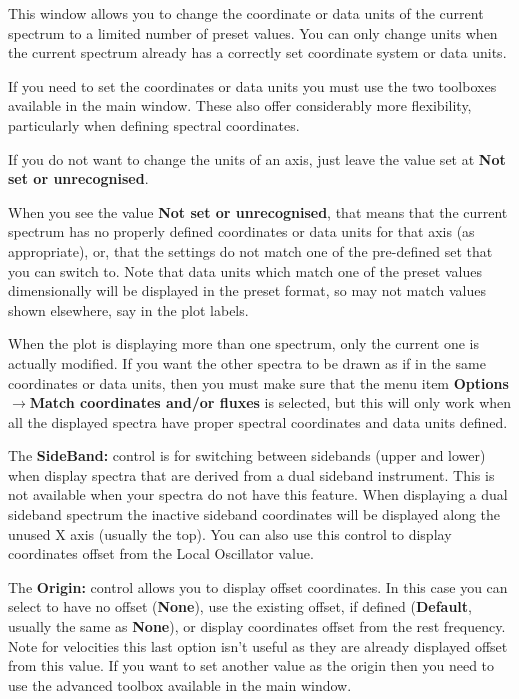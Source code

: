 \documentclass[twoside,11pt]{article}
\newcommand{\latexhtml}[2]{#1}
\renewcommand{\_}{\texttt{\symbol{95}}}
\newcommand{\submenuitem}[2]{\latexhtml{\textbf{#1$\rightarrow$#2}}{\textbf{#1->#2}}}
\newcommand{\labelitem}[1]{\textbf{#1}}
\begin{document}
This window allows you to change the coordinate or data units of the current
spectrum to a limited number of preset values. You can only change units when
the current spectrum already has a correctly set coordinate system or data
units.

If you need to set the coordinates or data units you must use the two
toolboxes available in the main window. These also offer considerably more
flexibility, particularly when defining spectral coordinates.

If you do not want to change the units of an axis, just leave the value set at
\labelitem{Not set or unrecognised}.

When you see the value \labelitem{Not set or unrecognised}, that means that
the current spectrum has no properly defined coordinates or data units for
that axis (as appropriate), or, that the settings do not match one of the
pre-defined set that you can switch to.  Note that data units which match one
of the preset values dimensionally will be displayed in the preset format, so
may not match values shown elsewhere, say in the plot labels.

When the plot is displaying more than one spectrum, only the current one is
actually modified. If you want the other spectra to be drawn as if in the same
coordinates or data units, then you must make sure that the menu item
\submenuitem{Options}{Match coordinates and/or fluxes} is selected, but this
will only work when all the displayed spectra have proper spectral coordinates
and data units defined.

The \labelitem{SideBand:} control is for switching between sidebands (upper
and lower) when display spectra that are derived from a dual sideband
instrument. This is not available when your spectra do not have this feature.
When displaying a dual sideband spectrum the inactive sideband coordinates
will be displayed along the unused X axis (usually the top). You
can also use this control to display coordinates offset from the Local
Oscillator value.

The \labelitem{Origin:} control allows you to display offset coordinates.
In this case you can select to have no offset (\labelitem{None}), use the
existing offset, if defined (\labelitem{Default}, usually the same as
\labelitem{None}), or display coordinates offset from the rest frequency.
Note for velocities this last option isn't useful as they are already
displayed offset from this value. If you want to set another value as the
origin then you need to use the advanced toolbox available in the main window.
\end{document}
